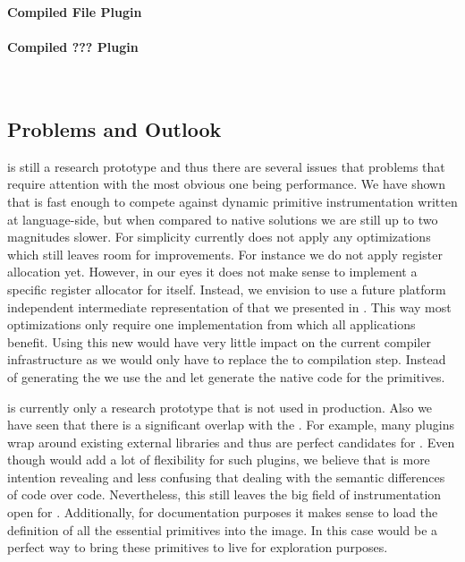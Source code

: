 \paragraph{\WF Compiled File Plugin}
\paragraph{\WF Compiled ??? Plugin}
\\


\subsection{Problems and Outlook}

\WF is still a research prototype and thus there are several issues that problems that require attention with the most obvious one being performance.
We have shown that \WF is fast enough to compete against dynamic primitive instrumentation written at language-side, but when compared to native solutions we are still up to two magnitudes slower.
For simplicity \WF currently does not apply any optimizations which still leaves room for improvements.
For instance we do not apply register allocation yet.
However, in our eyes it does not make sense to implement a specific register allocator for \WF itself.
Instead, we envision to use a future platform independent intermediate representation of \B that we presented in .
This way most optimizations only require one implementation from which all \B applications benefit.
Using this new \IR would have very little impact on the current \WF compiler infrastructure as we would only have to replace the \AST to \ASM compilation step.
Instead of generating the \ASM we use the \B \IR and let \B generate the native code for the primitives.

\WF is currently only a research prototype that is not used in production.
Also we have seen that there is a significant overlap with the \NB \FFI.
For example, many plugins wrap around existing external libraries and thus are perfect candidates for \NB.
Even though \WF would add a lot of flexibility for such plugins, we believe that \NB is more intention revealing and less confusing that dealing with the semantic differences of \Slang code over \PH code.
Nevertheless, this still leaves the big field of instrumentation open for \WF.
Additionally, for documentation purposes it makes sense to load the \Slang definition of all the essential primitives into the \PH image.
In this case \WF would be a perfect way to bring these primitives to live for exploration purposes.


